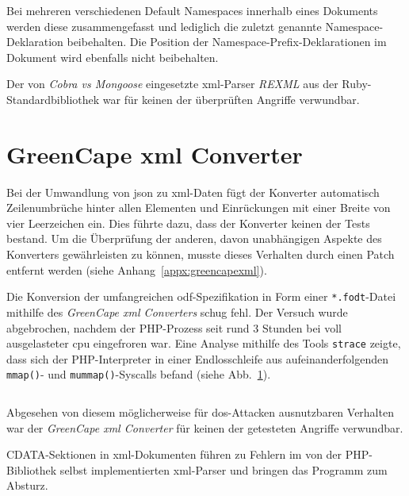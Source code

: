 Bei mehreren verschiedenen Default Namespaces innerhalb eines Dokuments werden diese zusammengefasst und lediglich die zuletzt genannte Namespace-Deklaration beibehalten. Die Position der Namespace-Prefix-Deklarationen im Dokument wird ebenfalls nicht beibehalten.

Der von \emph{Cobra vs Mongoose} eingesetzte \acrshort{xml}-Parser \emph{REXML} aus der Ruby\hyp{}Standardbibliothek war für keinen der überprüften Angriffe verwundbar.

\section{GreenCape \acrshort{xml} Converter}
\label{sec:greencapexml}

Bei der Umwandlung von \acrshort{json} zu \acrshort{xml}-Daten fügt der Konverter automatisch Zeilen\-umbrüche hinter allen Elementen und Einrückungen mit einer Breite von vier Leerzeichen ein. Dies führte dazu, dass der Konverter keinen der Tests bestand. Um die Überprüfung der anderen, davon unabhängigen Aspekte des Konverters gewährleisten zu können, musste dieses Verhalten durch einen Patch entfernt werden (siehe Anhang~\ref{appx:greencapexml}).

Die Konversion der umfangreichen \acrshort{odf}-Spezifikation in Form einer \texttt{*.fodt}-Datei mithilfe des \emph{GreenCape \acrshort{xml} Converters} schug fehl. Der Versuch wurde abgebrochen, nachdem der PHP-Prozess seit rund 3 Stunden bei voll ausgelasteter \acrshort{cpu} eingefroren war. Eine Analyse mithilfe des Tools \texttt{strace} zeigte, dass sich der PHP-Interpreter in einer Endlosschleife aus aufeinanderfolgenden \texttt{mmap()}- und \texttt{mummap()}-Syscalls befand (siehe Abb.~\ref{fig:greencapeloop}).

\begin{figure}[bp!]
    \inputminted{shell-session}{greencapexml-strace.txt}
    \label{fig:greencapeloop}
\end{figure}

Abgesehen von diesem möglicherweise für \acrshort{dos}-Attacken ausnutzbaren Verhalten war der \emph{GreenCape \acrshort{xml} Converter} für keinen der getesteten Angriffe verwundbar.

CDATA-Sektionen in \acrshort{xml}-Dokumenten führen zu Fehlern im von der PHP-Bibliothek selbst implementierten \acrshort{xml}-Parser und bringen das Programm zum Absturz.

